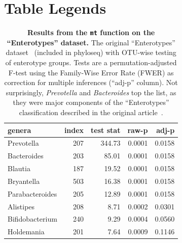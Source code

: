 \documentclass[10pt]{article}\usepackage{graphicx, color}
\newcommand{\code}[1]{{\texttt{#1}}}
\begin{document}
\clearpage





\clearpage
\section*{Table Legends}
\begin{table}[htbp]
\centering
\begin{tabular}{lrrrr}
\hline
genera  & index & 	test stat & raw-p & 	adj-p	\\
\hline
Prevotella                &      207 &344.73 & 0.0001 & 0.0158  \\
Bacteroides               &      203 & 85.01 & 0.0001 & 0.0158  \\
Blautia                   &      187 & 19.52 & 0.0001 & 0.0158  \\
Bryantella                &      503 & 16.38 & 0.0001 & 0.0158  \\
Parabacteroides           &      205 & 12.89 & 0.0001 & 0.0158  \\
Alistipes                 &      208 &  8.71 & 0.0002 & 0.0301  \\
Bifidobacterium           &      240 &  9.29 & 0.0004 & 0.0560  \\
Holdemania                &      201 &  7.64 & 0.0009 & 0.1146  \\
\hline
\end{tabular}
\caption{
{\bf Results from the \code{mt} function on the ``Enterotypes'' dataset.}
The original ``Enterotypes'' dataset~\cite{enterotypes}
(included in phyloseq)
with OTU-wise testing of enterotype groups. 
Tests are a permutation-adjusted F-test 
using the Family-Wise Error Rate (FWER)
as correction for multiple inferences (``adj-p'' column).
Not surprisingly, \emph{Prevotella} and \emph{Bacteroides} top the list,
as they were major components of the ``Enterotypes'' classification
described in the original article~\cite{enterotypes}.
}
\label{tab:entmt}
\end{table}
\end{document}
